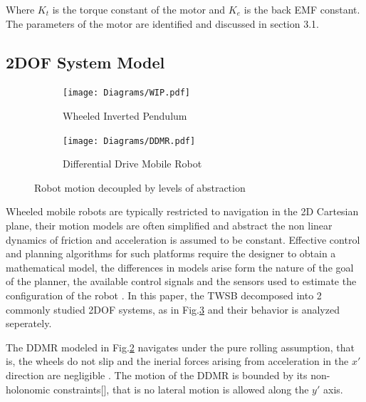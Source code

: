     Where $K_t$ is the torque constant of the motor and $K_e$ is the back EMF constant.
    The parameters of the motor are identified and discussed in section 3.1. 
    \pagebreak{}

    \subsection{2DOF System Model}
    \begin{figure}[h]
        \centering
        \begin{subfigure}[b]{0.4\textwidth}
            \texttt{[image: Diagrams/WIP.pdf]}
            \caption{Wheeled Inverted Pendulum}
            \label{fig:WIP}
        \end{subfigure}
        \hfill
        \begin{subfigure}[b]{0.4\textwidth}
            \texttt{[image: Diagrams/DDMR.pdf]}
            \caption{Differential Drive Mobile Robot}
            \label{fig:DDMR}
        \end{subfigure}
        \caption{Robot motion decoupled by levels of abstraction}
        \label{fig:2DOF}
    \end{figure}

    Wheeled mobile robots are typically restricted to navigation in the 2D Cartesian plane, their motion models are often simplified and 
    abstract the non linear dynamics of friction and acceleration is assumed to be constant. 
    Effective control and planning algorithms for such platforms require the designer to obtain a mathematical model, 
    the differences in models arise form the nature of the goal of the planner, the available control signals and the sensors 
    used to estimate the configuration of the robot \cite{ClassificationWheeled}. 
    In this paper, the TWSB decomposed into 2 commonly studied 2DOF systems, as in Fig.\ref{fig:2DOF} and their behavior is analyzed
    seperately.
    
    The DDMR modeled in Fig.\ref{fig:DDMR} navigates under the pure rolling assumption, that is, the wheels do not slip 
    and the inerial forces arising from acceleration in the $x'$ direction are negligible \cite{KinematicWheeled}. 
    The motion of the DDMR is bounded by its non-holonomic constraints[], that is no lateral motion is allowed along the $y'$ axis. 

